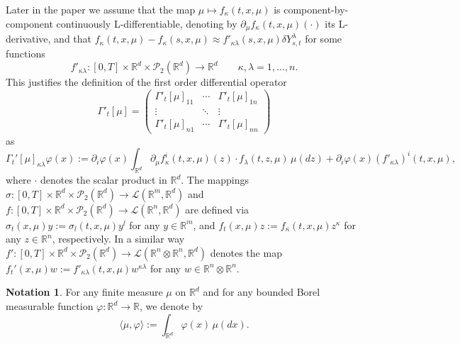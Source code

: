 \documentclass[10pt, a4paper]{article} %
\newcommand{\R}{\mathbb{R}}
\theoremstyle{definition}
\newtheorem*{notation}{Notation}
\theoremstyle{plain}
\begin{document}
%
Later in the paper we assume that
the map $\mu \mapsto f_\kappa(t,x,\mu)$ is component-by-component continuously L-differentiable, denoting by $\partial_\mu f_\kappa(t,x,\mu)(\cdot)$ its L-derivative, and that $f_\kappa(t,x,\mu) - f_\kappa(s,x,\mu) \approx f'_{\kappa \lambda} (s,x,\mu) \delta Y^\lambda_{s,t}$ for some functions 
\begin{equation*}
    f'_{\kappa \lambda} %
    : [0,T] \times \R^d \times \mathcal{P}_2(\R^d) \to \R^d \qquad \kappa,\lambda=1,\dots,n  .
\end{equation*} 
This justifies the definition of the first order differential operator $$ \Gamma'_t[\mu] = \begin{pmatrix}
\Gamma'_t[\mu]_{11} & \cdots & \Gamma'_t[\mu]_{1n} \\
\vdots & \ddots & \vdots \\
\Gamma'_t[\mu]_{n1} &  \cdots & \Gamma'_t[\mu]_{nn}
\end{pmatrix}$$  as 
\begin{equation*}
    \Gamma_t'[\mu]_{\kappa\lambda} \varphi(x) := \partial_i \varphi(x) \int_{\R^d} \partial_\mu f^i_\kappa (t,x,\mu)(z) \cdot f_\lambda(t,z,\mu) \, \mu(dz)  + \partial_i \varphi(x) (f'_{\kappa\lambda})^i(t,x,\mu) ,
\end{equation*}
where $\cdot$ denotes the scalar product in $\R^d$. 
%
The mappings $\sigma:[0,T] \times \R^d \times \mathcal{P}_2(\R^d) \to \mathscr{L}(\R^m,\R^d)$ and $f:[0,T] \times \R^d \times \mathcal{P}_2(\R^d) \to \mathscr{L}(\R^n,\R^d)$ are defined via $\sigma_t(x,\mu) y := \sigma_l(t,x,\mu) y^l$ for any $y \in \R^m$, and $f_t(x,\mu) z := f_\kappa(t,x,\mu) z^\kappa$ for any $z \in \R^n$, respectively. In a similar way $f':[0,T] \times \R^d \times \mathcal{P}_2(\R^d) \to \mathscr{L}(\R^n \otimes \R^n ,\R^d)$ denotes the map $f_t'(x,\mu) w := f'_{\kappa\lambda}(t,x,\mu) w^{\kappa \lambda}$ for any $w \in \R^n \otimes \R^n$. 

\begin{notation}
    For any finite measure $\mu$ on $\R^d$ and for any bounded Borel measurable function $\varphi:\R^d \to \R$, we denote by \begin{equation*}
    \langle \mu , \varphi \rangle := \int_{\R^d} \varphi (x) \, \mu(dx) . 
\end{equation*}
\end{notation}
\end{document}
